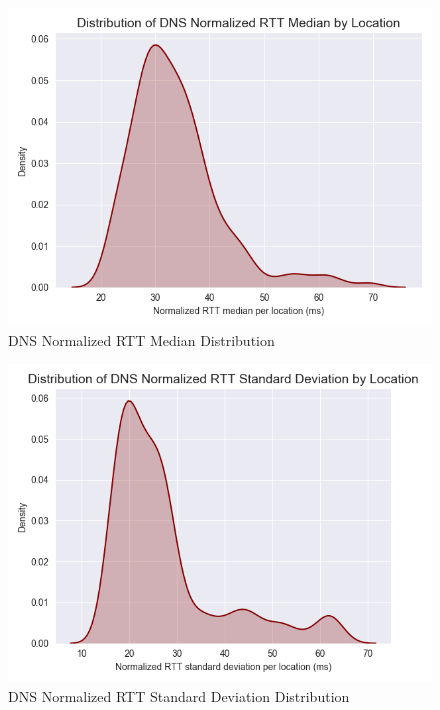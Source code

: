 \begin{figure}[H]
    \centering
    \includegraphics[width=\textwidth]{images/dns/dist_raw_data/dns_norm_rtt_median_distribution.png}
    \caption{DNS Normalized RTT Median Distribution}
    \label{fig:dns_analytics_norm_median_dist}
\end{figure}

\begin{figure}[H]
    \centering
    \includegraphics[width=\textwidth]{images/dns/dist_raw_data/dns_norm_rtt_stdev_distribution.png}
    \caption{DNS Normalized RTT Standard Deviation Distribution}
    \label{fig:dns_analytics_norm_stdev_dist}
\end{figure}

